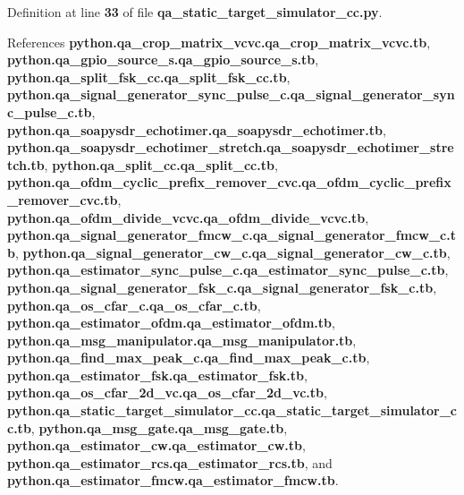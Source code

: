 Definition at line {\bf 33} of file {\bf qa\+\_\+static\+\_\+target\+\_\+simulator\+\_\+cc.\+py}.



References {\bf python.\+qa\+\_\+crop\+\_\+matrix\+\_\+vcvc.\+qa\+\_\+crop\+\_\+matrix\+\_\+vcvc.\+tb}, {\bf python.\+qa\+\_\+gpio\+\_\+source\+\_\+s.\+qa\+\_\+gpio\+\_\+source\+\_\+s.\+tb}, {\bf python.\+qa\+\_\+split\+\_\+fsk\+\_\+cc.\+qa\+\_\+split\+\_\+fsk\+\_\+cc.\+tb}, {\bf python.\+qa\+\_\+signal\+\_\+generator\+\_\+sync\+\_\+pulse\+\_\+c.\+qa\+\_\+signal\+\_\+generator\+\_\+sync\+\_\+pulse\+\_\+c.\+tb}, {\bf python.\+qa\+\_\+soapysdr\+\_\+echotimer.\+qa\+\_\+soapysdr\+\_\+echotimer.\+tb}, {\bf python.\+qa\+\_\+soapysdr\+\_\+echotimer\+\_\+stretch.\+qa\+\_\+soapysdr\+\_\+echotimer\+\_\+stretch.\+tb}, {\bf python.\+qa\+\_\+split\+\_\+cc.\+qa\+\_\+split\+\_\+cc.\+tb}, {\bf python.\+qa\+\_\+ofdm\+\_\+cyclic\+\_\+prefix\+\_\+remover\+\_\+cvc.\+qa\+\_\+ofdm\+\_\+cyclic\+\_\+prefix\+\_\+remover\+\_\+cvc.\+tb}, {\bf python.\+qa\+\_\+ofdm\+\_\+divide\+\_\+vcvc.\+qa\+\_\+ofdm\+\_\+divide\+\_\+vcvc.\+tb}, {\bf python.\+qa\+\_\+signal\+\_\+generator\+\_\+fmcw\+\_\+c.\+qa\+\_\+signal\+\_\+generator\+\_\+fmcw\+\_\+c.\+tb}, {\bf python.\+qa\+\_\+signal\+\_\+generator\+\_\+cw\+\_\+c.\+qa\+\_\+signal\+\_\+generator\+\_\+cw\+\_\+c.\+tb}, {\bf python.\+qa\+\_\+estimator\+\_\+sync\+\_\+pulse\+\_\+c.\+qa\+\_\+estimator\+\_\+sync\+\_\+pulse\+\_\+c.\+tb}, {\bf python.\+qa\+\_\+signal\+\_\+generator\+\_\+fsk\+\_\+c.\+qa\+\_\+signal\+\_\+generator\+\_\+fsk\+\_\+c.\+tb}, {\bf python.\+qa\+\_\+os\+\_\+cfar\+\_\+c.\+qa\+\_\+os\+\_\+cfar\+\_\+c.\+tb}, {\bf python.\+qa\+\_\+estimator\+\_\+ofdm.\+qa\+\_\+estimator\+\_\+ofdm.\+tb}, {\bf python.\+qa\+\_\+msg\+\_\+manipulator.\+qa\+\_\+msg\+\_\+manipulator.\+tb}, {\bf python.\+qa\+\_\+find\+\_\+max\+\_\+peak\+\_\+c.\+qa\+\_\+find\+\_\+max\+\_\+peak\+\_\+c.\+tb}, {\bf python.\+qa\+\_\+estimator\+\_\+fsk.\+qa\+\_\+estimator\+\_\+fsk.\+tb}, {\bf python.\+qa\+\_\+os\+\_\+cfar\+\_\+2d\+\_\+vc.\+qa\+\_\+os\+\_\+cfar\+\_\+2d\+\_\+vc.\+tb}, {\bf python.\+qa\+\_\+static\+\_\+target\+\_\+simulator\+\_\+cc.\+qa\+\_\+static\+\_\+target\+\_\+simulator\+\_\+cc.\+tb}, {\bf python.\+qa\+\_\+msg\+\_\+gate.\+qa\+\_\+msg\+\_\+gate.\+tb}, {\bf python.\+qa\+\_\+estimator\+\_\+cw.\+qa\+\_\+estimator\+\_\+cw.\+tb}, {\bf python.\+qa\+\_\+estimator\+\_\+rcs.\+qa\+\_\+estimator\+\_\+rcs.\+tb}, and {\bf python.\+qa\+\_\+estimator\+\_\+fmcw.\+qa\+\_\+estimator\+\_\+fmcw.\+tb}.

